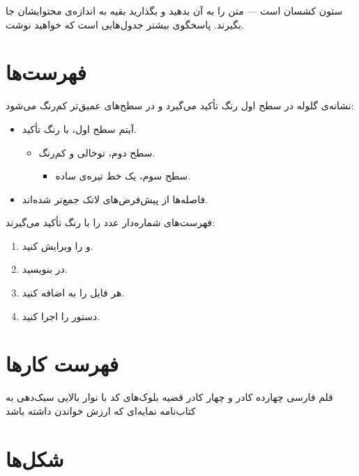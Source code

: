 \begin{note}
 ستون کشسان است — متن را به آن بدهید و بگذارید بقیه به اندازه‌ی
محتوایشان جا بگیرند.  پاسخگوی بیشتر جدول‌هایی
است که خواهید نوشت.
\end{note}

\section{فهرست‌ها}

نشانه‌ی گلوله در سطح اول رنگ تأکید می‌گیرد و در سطح‌های عمیق‌تر کم‌رنگ می‌شود:

\begin{itemize}
  \item آیتم سطح اول، با رنگ تأکید.
  \begin{itemize}
    \item سطح دوم، توخالی و کم‌رنگ.
    \begin{itemize}
      \item سطح سوم، یک خط تیره‌ی ساده.
    \end{itemize}
  \end{itemize}
  \item فاصله‌ها از پیش‌فرض‌های لاتک جمع‌تر شده‌اند.
\end{itemize}

فهرست‌های شماره‌دار عدد را با رنگ تأکید می‌گیرند:

\begin{enumerate}
  \item {} و  را ویرایش کنید.
  \item در  بنویسید.
  \item هر فایل را به  اضافه کنید.
  \item دستور  را اجرا کنید.
\end{enumerate}

\section{فهرست کارها}

\begin{tasks}
  \task[done] قلم فارسی 
  \task[done] چهارده کادر و چهار کادر قضیه
  \task[done] بلوک‌های کد با نوار بالایی
  \task سبک‌دهی به کتاب‌نامه
  \task نمایه‌ای که ارزش خواندن داشته باشد
\end{tasks}

\section{شکل‌ها}

